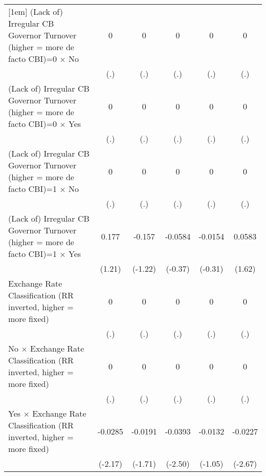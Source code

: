 {\begin{tabular*}{\linewidth}{@{\hskip\tabcolsep\extracolsep\fill}l*{5}{c}}
[1em]
(Lack of) Irregular CB Governor Turnover (higher = more de facto CBI)=0 $\times$ No&        0         &        0         &        0         &        0         &        0         \\
                &      (.)         &      (.)         &      (.)         &      (.)         &      (.)         \\
[1em]
(Lack of) Irregular CB Governor Turnover (higher = more de facto CBI)=0 $\times$ Yes&        0         &        0         &        0         &        0         &        0         \\
                &      (.)         &      (.)         &      (.)         &      (.)         &      (.)         \\
[1em]
(Lack of) Irregular CB Governor Turnover (higher = more de facto CBI)=1 $\times$ No&        0         &        0         &        0         &        0         &        0         \\
                &      (.)         &      (.)         &      (.)         &      (.)         &      (.)         \\
[1em]
(Lack of) Irregular CB Governor Turnover (higher = more de facto CBI)=1 $\times$ Yes&    0.177         &   -0.157         &  -0.0584         &  -0.0154         &   0.0583         \\
                &   (1.21)         &  (-1.22)         &  (-0.37)         &  (-0.31)         &   (1.62)         \\
[1em]
Exchange Rate Classification (RR inverted, higher = more fixed)&        0         &        0         &        0         &        0         &        0         \\
                &      (.)         &      (.)         &      (.)         &      (.)         &      (.)         \\
[1em]
No $\times$ Exchange Rate Classification (RR inverted, higher = more fixed)&        0         &        0         &        0         &        0         &        0         \\
                &      (.)         &      (.)         &      (.)         &      (.)         &      (.)         \\
[1em]
Yes $\times$ Exchange Rate Classification (RR inverted, higher = more fixed)&  -0.0285\sym{*}  &  -0.0191         &  -0.0393\sym{*}  &  -0.0132         &  -0.0227\sym{**} \\
                &  (-2.17)         &  (-1.71)         &  (-2.50)         &  (-1.05)         &  (-2.67)         \\

\end{tabular*}}

